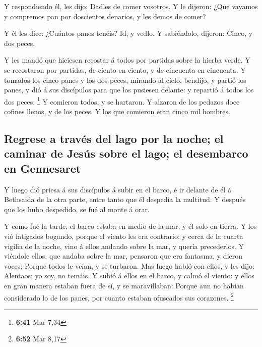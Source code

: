  Y respondiendo él, les dijo: Dadles de comer vosotros. Y
le dijeron: ¿Que vayamos y compremos pan por doscientos denarios, y les
demos de comer?

 Y él les dice: ¿Cuántos panes tenéis? Id, y vedlo. Y
sabiéndolo, dijeron: Cinco, y dos peces.

 Y les mandó que hiciesen recostar á todos por partidas
sobre la hierba verde.  Y se recostaron por partidas, de
ciento en ciento, y de cincuenta en cincuenta.  Y tomados
los cinco panes y los dos peces, mirando al cielo, bendijo, y partió los
panes, y dió á sus discípulos para que los pusiesen delante: y repartió
á todos los dos peces. \footnote{\textbf{6:41} Mar 7,34}  Y
comieron todos, y se hartaron.  Y alzaron de los pedazos
doce cofines llenos, y de los peces.  Y los que comieron
eran cinco mil hombres.

\hypertarget{regrese-a-travuxe9s-del-lago-por-la-noche-el-caminar-de-jesuxfas-sobre-el-lago-el-desembarco-en-gennesaret}{%
\subsection{Regrese a través del lago por la noche; el caminar de Jesús
sobre el lago; el desembarco en
Gennesaret}\label{regrese-a-travuxe9s-del-lago-por-la-noche-el-caminar-de-jesuxfas-sobre-el-lago-el-desembarco-en-gennesaret}}

 Y luego dió priesa á sus discípulos á subir en el barco, é
ir delante de él á Bethsaida de la otra parte, entre tanto que él
despedía la multitud.  Y después que los hubo despedido, se
fué al monte á orar.

 Y como fué la tarde, el barco estaba en medio de la mar, y
él solo en tierra.  Y los vió fatigados bogando, porque el
viento les era contrario: y cerca de la cuarta vigilia de la noche, vino
á ellos andando sobre la mar, y quería precederlos.  Y
viéndole ellos, que andaba sobre la mar, pensaron que era fantasma, y
dieron voces;  Porque todos le veían, y se turbaron. Mas
luego habló con ellos, y les dijo: Alentaos; yo soy, no temáis.
 Y subió á ellos en el barco, y calmó el viento: y ellos en
gran manera estaban fuera de sí, y se maravillaban:  Porque
aun no habían considerado lo de los panes, por cuanto estaban ofuscados
sus corazones. \footnote{\textbf{6:52} Mar 8,17}

